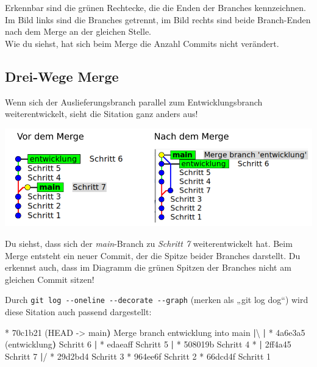 \documentclass[
  letterpaper,
  DIV=11]{scrreprt}
\newenvironment{Shaded}{\begin{snugshade}}{\end{snugshade}}
\newcommand{\AttributeTok}[1]{\textcolor[rgb]{0.40,0.45,0.13}{#1}}
\newcommand{\ErrorTok}[1]{\textcolor[rgb]{0.68,0.00,0.00}{#1}}
\newcommand{\ExtensionTok}[1]{\textcolor[rgb]{0.00,0.23,0.31}{#1}}
\newcommand{\KeywordTok}[1]{\textcolor[rgb]{0.00,0.23,0.31}{\textbf{#1}}}
\newcommand{\NormalTok}[1]{\textcolor[rgb]{0.00,0.23,0.31}{#1}}
\newcommand{\OperatorTok}[1]{\textcolor[rgb]{0.37,0.37,0.37}{#1}}
\newcommand{\StringTok}[1]{\textcolor[rgb]{0.13,0.47,0.30}{#1}}
\begin{document}
Erkennbar sind die grünen Rechtecke, die die Enden der Branches
kennzeichnen. Im Bild links sind die Branches getrennt, im Bild rechts
sind beide Branch-Enden nach dem Merge an der gleichen Stelle.\\
Wie du siehst, hat sich beim Merge die Anzahl Commits nicht verändert.

\subsection{Drei-Wege Merge}\label{drei-wege-merge}

Wenn sich der Auslieferungsbranch parallel zum Entwicklungsbranch
weiterentwickelt, sieht die Sitation ganz anders aus!

\includegraphics{bilder/bash/drei_wege.png}

Du siehst, dass sich der \emph{main}-Branch zu \emph{Schritt 7}
weiterentwickelt hat. Beim Merge entsteht ein neuer Commit, der die
Spitze beider Branches darstellt. Du erkennst auch, dass im Diagramm die
grünen Spitzen der Branches nicht am gleichen Commit sitzen!

Durch \texttt{git\ log\ -\/-oneline\ -\/-decorate\ -\/-graph} (merken
als „git log dog``) wird diese Sitation auch passend dargestellt:

\begin{Shaded}
\begin{Highlighting}[]
\ExtensionTok{*}\NormalTok{   70c1b21 }\ErrorTok{(}\ExtensionTok{HEAD} \AttributeTok{{-}}\OperatorTok{\textgreater{}}\NormalTok{ main}\KeywordTok{)} \ExtensionTok{Merge}\NormalTok{ branch }\StringTok{\textquotesingle{}entwicklung\textquotesingle{}}\NormalTok{ into main}
\KeywordTok{|}\ExtensionTok{\textbackslash{} } 
\KeywordTok{|} \ExtensionTok{*}\NormalTok{ 4a6e3a5 }\ErrorTok{(}\ExtensionTok{entwicklung}\KeywordTok{)} \ExtensionTok{Schritt}\NormalTok{ 6}
\KeywordTok{|} \ExtensionTok{*}\NormalTok{ edaeaff Schritt 5}
\KeywordTok{|} \ExtensionTok{*}\NormalTok{ 508019b Schritt 4}
\ExtensionTok{*} \KeywordTok{|} \ExtensionTok{2ff4a45}\NormalTok{ Schritt 7}
\KeywordTok{|}\ExtensionTok{/}  
\ExtensionTok{*}\NormalTok{ 29d2bd4 Schritt 3}
\ExtensionTok{*}\NormalTok{ 964ee6f Schritt 2}
\ExtensionTok{*}\NormalTok{ 66dcd4f Schritt 1}
\end{Highlighting}
\end{Shaded}
\end{document}
